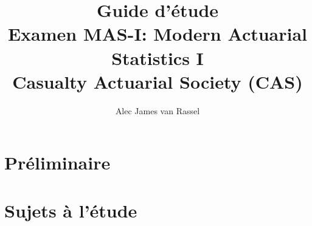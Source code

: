 \documentclass[12pt, titlepage, french]{report}
\title{
	Guide d'étude	\\
	\large Examen MAS-I: Modern Actuarial Statistics I\\
	Casualty Actuarial Society (CAS)}
\date{}
\author{Alec James van Rassel}
\begin{document}
\maketitle

\tableofcontents

\clearpage

\part*{Préliminaire}



\part*{Sujets à l'étude}



\newpage



\newpage



\newpage



\newpage
\end{document}
